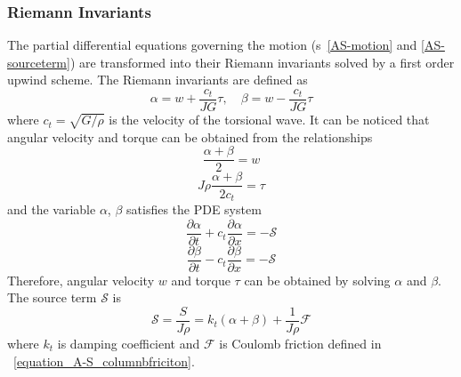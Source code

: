 \subsubsection{Riemann Invariants}
The partial differential equations governing the motion (\equationname{}s~\ref{AS-motion} and \ref{AS-sourceterm}) are transformed into their Riemann invariants solved by a first order upwind scheme. The Riemann invariants are defined as
\begin{equation}\label{AS-Riemann}
  \alpha = w + \frac{c_t}{JG}\tau, \quad \beta=w-\frac{c_t}{JG}\tau
\end{equation}
where $c_t = \sqrt{G/\rho}$ is the velocity of the torsional wave. It can be noticed that angular velocity and torque can be obtained from the relationships
\begin{equation}\label{equation_Riemann_relation1}
  \frac{\alpha + \beta}{2} = w
\end{equation}
\begin{equation}\label{equation_Riemann_relation2}
  J \rho \frac{\alpha + \beta}{2c_t} = \tau
\end{equation}
and the variable $\alpha$, $\beta$ satisfies the PDE system
\begin{equation}\label{AS-Riemann_alpha}
  \frac{\partial \alpha}{\partial t} + c_t\frac{\partial \alpha}{\partial x} = -\mathcal{S}
\end{equation}
\begin{equation}\label{AS-Riemann_beta}
  \frac{\partial \beta}{\partial t} - c_t\frac{\partial \beta}{\partial x} = -\mathcal{S}
\end{equation}
Therefore, angular velocity $w$ and torque $\tau$ can be obtained by solving $\alpha$ and $\beta$.
The source term $\mathcal{S}$ is
\begin{equation}\label{AS-source}
  \mathcal{S} = \frac{S}{J \rho} = k_t(\alpha + \beta) + \frac{1}{J \rho} \mathcal{F}
\end{equation} 
where $k_t$ is damping coefficient and $\mathcal{F}$ is Coulomb friction defined in \equationname~\ref{equation_A-S_columnbfriciton}.
